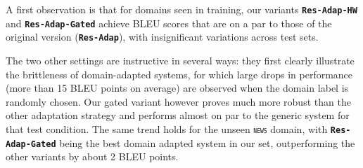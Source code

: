 \documentclass[11pt,a4paper]{article}
\newcommand{\fyTodo}[1]{\Todo[FY:]{\textcolor{orange}{#1}}}
\newcommand{\fyFuture}[1]{\done[FY]\Todo[FY:]{\textcolor{red}{#1}}}
\newcommand{\domain}[1]{\texttt{\textsc{#1}}}
\newcommand{\system}[1]{\texttt{\textbf{#1}}}
\begin{document}
A first observation is that for domains seen in training, our variants \system{Res-Adap-HW} and \system{Res-Adap-Gated} achieve BLEU scores that are on a par to those of the original version (\system{Res-Adap}), with insignificant variations across test sets.\fyFuture{Comment on processing time.}

The two other settings are instructive in several ways: they first clearly illustrate the brittleness of domain-adapted systems, for which large drops in performance (more than 15 BLEU points on average) are observed when the domain label is randomly chosen. Our gated variant however proves much more robust than the other adaptation strategy and performs almost on par to the generic system for that test condition. The same trend holds for the unseen \domain{news} domain, with \system{Res-Adap-Gated} being the best domain adapted system in our set, outperforming the other variants by about 2 BLEU points.



\end{document}
